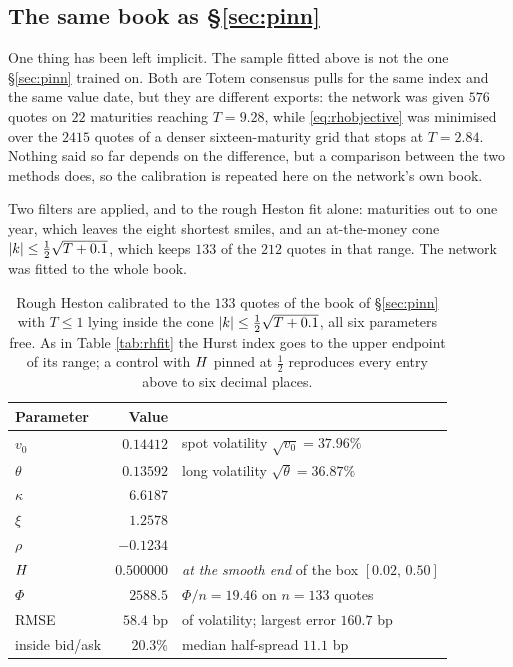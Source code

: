 \subsection{The same book as \S\ref{sec:pinn}}
\label{subsec:rhpinn}

One thing has been left implicit. The sample fitted above is not the one \S\ref{sec:pinn} trained on.
Both are Totem consensus pulls for the same index and the same value date, but they are different
exports: the network was given $576$ quotes on $22$ maturities reaching $T=9.28$, while
\eqref{eq:rhobjective} was minimised over the $2415$ quotes of a denser sixteen-maturity grid that
stops at $T=2.84$. Nothing said so far depends on the difference, but a comparison between the two
methods does, so the calibration is repeated here on the network's own book.

Two filters are applied, and to the rough Heston fit alone: maturities out to one year, which leaves
the eight shortest smiles, and an at-the-money cone $|k|\le\tfrac12\sqrt{T+0.1}$, which keeps
$133$ of the $212$ quotes in that range. The network was fitted to the whole book.

\begin{table}[H]
\centering
\small
\begin{tabular}{lrl}
\hline
Parameter & Value & \\
\hline
$v_{0}$ & $0.14412$ & spot volatility $\sqrt{v_{0}}=37.96\%$\\
$\theta$ & $0.13592$ & long volatility $\sqrt{\theta}=36.87\%$\\
$\kappa$ & $6.6187$ & \\
$\xi$ & $1.2578$ & \\
$\rho$ & $-0.1234$ & \\
$H$ & $0.500000$ & \emph{at the smooth end} of the box $[0.02,\,0.50]$\\
\hline
$\Phi$ & $2588.5$ & $\Phi/n=19.46$ on $n=133$ quotes\\
RMSE & $58.4$ bp & of volatility; largest error $160.7$ bp\\
inside bid/ask & $20.3\%$ & median half-spread $11.1$ bp\\
\hline
\end{tabular}
\caption[Rough Heston on the network's own book]{Rough Heston calibrated to the $133$ quotes of the book of \S\ref{sec:pinn} with $T\le1$
lying inside the cone $|k|\le\tfrac12\sqrt{T+0.1}$, all six parameters free. As in Table
\ref{tab:rhfit} the Hurst index goes to the upper endpoint of its range; a control with $H$
pinned at $\tfrac12$ reproduces every entry above to six decimal places.}
\label{tab:rhpinn}
\end{table}

